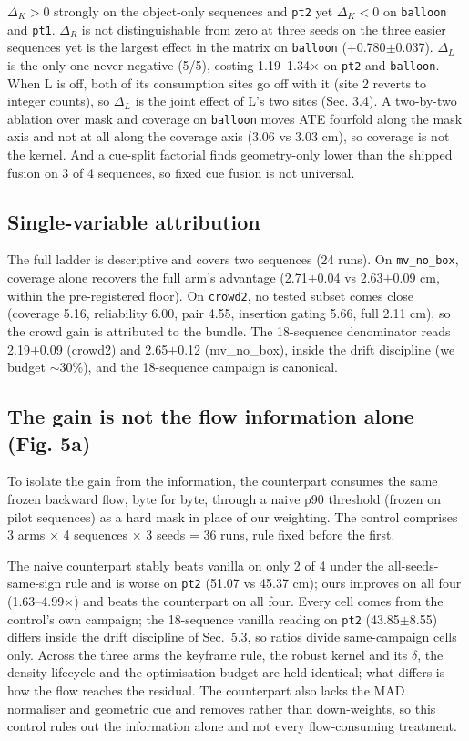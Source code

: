 $\Delta_K > 0$ strongly on the object-only sequences and \texttt{pt2} yet $\Delta_K < 0$ on \texttt{balloon} and \texttt{pt1}. $\Delta_R$ is not distinguishable from zero at three seeds on the three easier sequences yet is the largest effect in the matrix on \texttt{balloon} (+0.780$\pm$0.037). $\Delta_L$ is the only one never negative (5/5), costing 1.19--1.34$\times$ on \texttt{pt2} and \texttt{balloon}. When L is off, both of its consumption sites go off with it (site 2 reverts to integer counts), so $\Delta_L$ is the joint effect of L's two sites (Sec. 3.4). A two-by-two ablation over mask and coverage on \texttt{balloon} moves ATE fourfold along the mask axis and not at all along the coverage axis (3.06 vs 3.03 cm), so coverage is not the kernel. And a cue-split factorial finds geometry-only lower than the shipped fusion on 3 of 4 sequences, so fixed cue fusion is not universal.


\subsection{Single-variable attribution}


The full ladder is descriptive and covers two sequences (24 runs). On \texttt{mv\_no\_box}, coverage alone recovers the full arm's advantage (2.71$\pm$0.04 vs 2.63$\pm$0.09 cm, within the pre-registered floor). On \texttt{crowd2}, no tested subset comes close (coverage 5.16, reliability 6.00, pair 4.55, insertion gating 5.66, full 2.11 cm), so the crowd gain is attributed to the bundle. The 18-sequence denominator reads 2.19$\pm$0.09 (crowd2) and 2.65$\pm$0.12 (mv\_no\_box), inside the drift discipline (we budget $\sim$30\%), and the 18-sequence campaign is canonical.


\subsection{The gain is not the flow information alone (Fig. 5a)}


To isolate the gain from the information, the counterpart consumes the same frozen backward flow, byte for byte, through a naive p90 threshold (frozen on pilot sequences) as a hard mask in place of our weighting. The control comprises 3 arms $\times$ 4 sequences $\times$ 3 seeds = 36 runs, rule fixed before the first.


The naive counterpart stably beats vanilla on only 2 of 4 under the all-seeds-same-sign rule and is worse on \texttt{pt2} (51.07 vs 45.37 cm); ours improves on all four (1.63--4.99$\times$) and beats the counterpart on all four. Every cell comes from the control's own campaign; the 18-sequence vanilla reading on \texttt{pt2} (43.85$\pm$8.55) differs inside the drift discipline of Sec.~5.3, so ratios divide same-campaign cells only. Across the three arms the keyframe rule, the robust kernel and its $\delta$, the density lifecycle and the optimisation budget are held identical; what differs is how the flow reaches the residual. The counterpart also lacks the MAD normaliser and geometric cue and removes rather than down-weights, so this control rules out the information alone and not every flow-consuming treatment.


